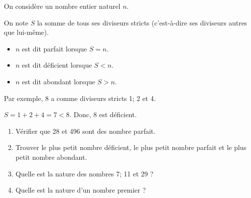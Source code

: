 \begin{Maquette}[Fiche,CorrigeFin,Colonnes=2]{}
\begin{multicols}{2}
      \begin{exercice}[Dur] %
         On considère un nombre entier naturel $n$. \par
         On note $S$ la somme de tous ses diviseurs stricts (c'est-à-dire ses diviseurs autres que lui-même). 
         \begin{itemize}
            \item $n$ est dit parfait lorsque $S=n$.
            \item $n$ est dit déficient lorsque $S<n$.
            \item $n$ est dit abondant lorsque $S>n$.
         \end{itemize}
         Par exemple, 8 a comme diviseurs stricts 1; 2 et 4. \par
         $S =1+2+4 =7< 8$. Donc, 8 est déficient.
         \begin{enumerate}
            \item Vérifier que 28 et 496 sont des nombre parfait.
            \item Trouver le plus petit nombre déficient, le plus petit nombre parfait et le plus petit nombre abondant.
            \item Quelle est la nature des nombres 7; 11 et 29 ?
            \item Quelle est la nature d'un nombre premier ?
         \end{enumerate}
      \end{exercice}


\end{multicols}
\end{Maquette}
